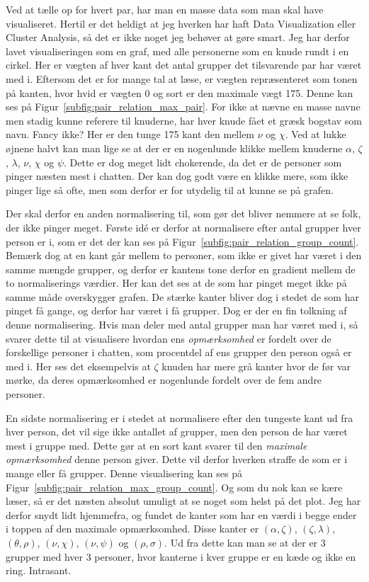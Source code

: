 \documentclass{article}
\begin{document}
Ved at tælle op for hvert par, har man en masse data som man skal have visualiseret. Hertil er det heldigt at jeg hverken har haft Data Visualization eller Cluster Analysis, så det er ikke noget jeg behøver at gøre smart. Jeg har derfor lavet visualiseringen som en graf, med alle personerne som en knude rundt i en cirkel. Her er vægten af hver kant det antal grupper det tilsvarende par har været med i. Eftersom det er for mange tal at læse, er vægten repræsenteret som tonen på kanten, hvor hvid er vægten 0 og sort er den maximale vægt 175.
Denne kan ses på Figur~\ref{subfig:pair_relation_max_pair}. For ikke at nævne en masse navne men stadig kunne referere til knuderne, har hver knude fået et græsk bogstav som navn. Fancy ikke?
Her er den tunge 175 kant den mellem $\nu$ og $\chi$. Ved at lukke øjnene halvt kan man lige se at der er en nogenlunde klikke mellem knuderne $\alpha$, $\zeta$, $\lambda$, $\nu$, $\chi$ og $\psi$. Dette er dog meget lidt chokerende, da det er de personer som pinger næsten mest i chatten. Der kan dog godt være en klikke mere, som ikke pinger lige så ofte, men som derfor er for utydelig til at kunne se på grafen.

Der skal derfor en anden normalisering til, som gør det bliver nemmere at se folk, der ikke pinger meget. Første idé er derfor at normalisere efter antal grupper hver person er i, som er det der kan ses på Figur~\ref{subfig:pair_relation_group_count}. Bemærk dog at en kant går mellem to personer, som ikke er givet har været i den samme mængde grupper, og derfor er kantens tone derfor en gradient mellem de to normaliserings værdier. Her kan det ses at de som har pinget meget ikke på samme måde overskygger grafen. De stærke kanter bliver dog i stedet de som har pinget få gange, og derfor har været i få grupper. Dog er der en fin tolkning af denne normalisering. Hvis man deler med antal grupper man har været med i, så svarer dette til at visualisere hvordan ens \emph{opmærksomhed} er fordelt over de forskellige personer i chatten, som procentdel af ens grupper den person også er med i. Her ses det eksempelvis at $\zeta$ knuden har mere grå kanter hvor de før var mørke, da deres opmærksomhed er nogenlunde fordelt over de fem andre personer.

En sidste normalisering er i stedet at normalisere efter den tungeste kant ud fra hver person, det vil sige ikke antallet af grupper, men den person de har været mest i gruppe med. Dette gør at en sort kant svarer til den \emph{maximale opmærksomhed} denne person giver. Dette vil derfor hverken straffe de som er i mange eller få grupper. Denne visualisering kan ses på Figur~\ref{subfig:pair_relation_max_group_count}. Og som du nok kan se kære læser, så er det næsten absolut umuligt at se noget som helst på det plot. Jeg har derfor snydt lidt hjemmefra, og fundet de kanter som har en værdi i begge ender i toppen af den maximale opmærksomhed. Disse kanter er $(\alpha, \zeta)$, $(\zeta, \lambda)$, $(\theta, \rho)$, $(\nu, \chi)$, $(\nu, \psi)$ og $(\rho, \sigma)$. Ud fra dette kan man se at der er 3 grupper med hver 3 personer, hvor kanterne i kver gruppe er en kæde og ikke en ring. Intrasant.
\end{document}
